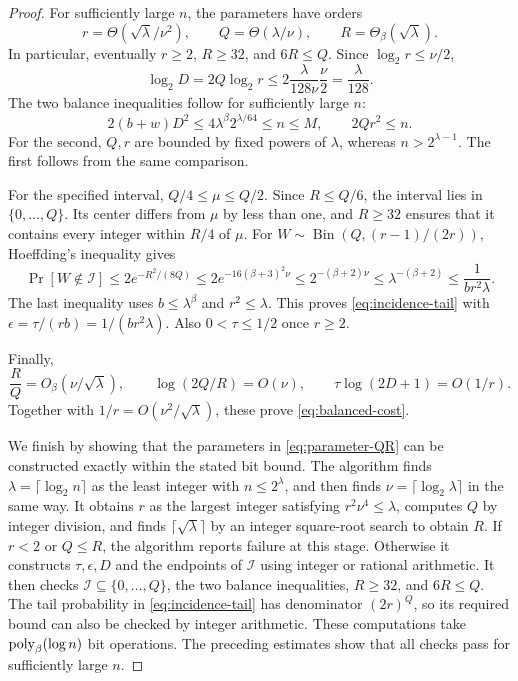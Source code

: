 \begin{proof}
For sufficiently large $n$, the parameters have orders
\[
 r=\Theta(\sqrt\lambda/\nu^2),\qquad
 Q=\Theta(\lambda/\nu),\qquad R=\Theta_\beta(\sqrt\lambda).
\]
In particular, eventually $r\ge2$, $R\ge32$, and $6R\le Q$.
Since $\log_2 r\le\nu/2$,
\[
 \log_2 D=2Q\log_2 r
 \le2\frac{\lambda}{128\nu}\frac\nu2=\frac{\lambda}{128}.
\]
The two balance inequalities follow for sufficiently large $n$:
\[
 2(b+w)D^2\le4\lambda^\beta2^{\lambda/64}\le n\le M,
 \qquad 2Qr^2\le n.
\]
For the second, $Q,r$ are bounded by fixed powers of $\lambda$,
whereas $n>2^{\lambda-1}$. The first follows from the same comparison.

For the specified interval, $Q/4\le\mu\le Q/2$. Since $R\le Q/6$, the interval lies in
$\{0,\ldots,Q\}$. Its center differs from $\mu$ by less than one,
and $R\ge32$ ensures that it contains every integer within $R/4$
of $\mu$. For $W\sim\operatorname{Bin}(Q,(r-1)/(2r))$, Hoeffding's
inequality gives
\[
 \Pr[W\notin\mathcal I]
 \le2e^{-R^2/(8Q)}
 \le2e^{-16(\beta+3)^2\nu}
 \le2^{-(\beta+2)\nu}
 \le\lambda^{-(\beta+2)}
 \le\frac1{br^2\lambda}.
\]
The last inequality uses $b\le\lambda^\beta$ and $r^2\le\lambda$.
This proves \eqref{eq:incidence-tail} with
$\epsilon=\tau/(rb)=1/(br^2\lambda)$. Also $0<\tau\le1/2$ once $r\ge2$.

Finally,
\[
 \frac RQ=O_\beta(\nu/\sqrt\lambda),\qquad
 \log(2Q/R)=O(\nu),\qquad
 \tau\log(2D+1)=O(1/r).
\]
Together with $1/r=O(\nu^2/\sqrt\lambda)$, these prove
\eqref{eq:balanced-cost}.

We finish by showing that the parameters in \eqref{eq:parameter-QR}
can be constructed exactly within the stated bit bound.
The algorithm finds $\lambda=\lceil\log_2 n\rceil$ as the least
integer with $n\le2^\lambda$, and then finds
$\nu=\lceil\log_2\lambda\rceil$ in the same way. It obtains $r$ as
the largest integer satisfying $r^2\nu^4\le\lambda$, computes $Q$
by integer division, and finds $\lceil\sqrt\lambda\rceil$ by an
integer square-root search to obtain $R$.
If $r<2$ or $Q\le R$, the algorithm reports failure at this stage.
Otherwise it constructs $\tau,\epsilon,D$ and the endpoints of
$\mathcal I$ using integer or rational arithmetic. It then checks
$\mathcal I\subseteq\{0,\ldots,Q\}$, the two balance inequalities,
$R\ge32$, and $6R\le Q$. The tail probability in
\eqref{eq:incidence-tail} has denominator $(2r)^Q$, so its required
bound can also be checked by integer arithmetic. These computations
take $\operatorname{poly}_\beta(\log n)$ bit operations. The preceding estimates
show that all checks pass for sufficiently large $n$.
\end{proof}

